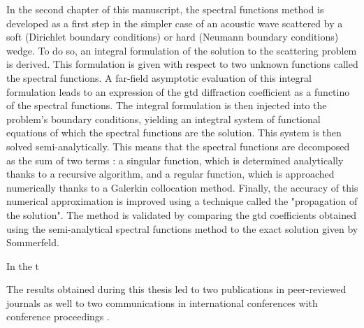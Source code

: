 In the second chapter of this manuscript, the spectral functions method is developed as a first step in the simpler case of an acoustic wave scattered by a soft (Dirichlet boundary conditions) or hard (Neumann boundary conditions) wedge. To do so, an integral formulation of the solution to the scattering problem is derived. This formulation is given with respect to two unknown functions called the spectral functions. A far-field asymptotic evaluation of this integral formulation leads to an expression of the \acrshort{gtd} diffraction coefficient as a functino of the spectral functions. The integral formulation is then injected into the problem's boundary conditions, yielding an integtral system of functional equations of which the spectral functions are the solution. This system is then solved semi-analytically. This means that the spectral functions are decomposed as the sum of two terms : a singular function, which is determined analytically thanks to a recursive algorithm, and a regular function, which is approached numerically thanks to a Galerkin collocation method. Finally, the accuracy of this numerical approximation is improved using a technique called the "propagation of the solution". The method is validated by comparing the \acrshort{gtd} coefficients obtained using the semi-analytical spectral functions method to the exact solution given by Sommerfeld.

In the t

The results obtained during this thesis led to two publications in peer-reviewed journals \cite{article, articleelasto} as well to two communications in international conferences with conference proceedings \cite{DD2018,AFPAC}.

